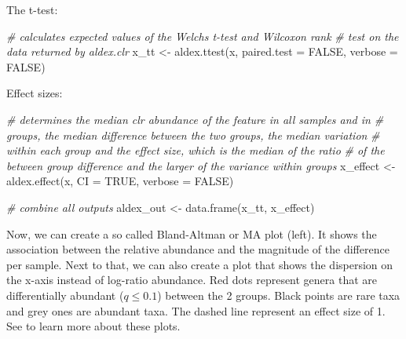 \documentclass[
]{book}
\newenvironment{Shaded}{\begin{snugshade}}{\end{snugshade}}
\newcommand{\AttributeTok}[1]{\textcolor[rgb]{0.77,0.63,0.00}{#1}}
\newcommand{\CommentTok}[1]{\textcolor[rgb]{0.56,0.35,0.01}{\textit{#1}}}
\newcommand{\ConstantTok}[1]{\textcolor[rgb]{0.00,0.00,0.00}{#1}}
\newcommand{\DecValTok}[1]{\textcolor[rgb]{0.00,0.00,0.81}{#1}}
\newcommand{\FunctionTok}[1]{\textcolor[rgb]{0.00,0.00,0.00}{#1}}
\newcommand{\NormalTok}[1]{#1}
\newcommand{\OtherTok}[1]{\textcolor[rgb]{0.56,0.35,0.01}{#1}}
\newcommand{\SpecialCharTok}[1]{\textcolor[rgb]{0.00,0.00,0.00}{#1}}
\begin{document}
\begin{Shaded}
\end{Shaded}

The t-test:

\begin{Shaded}
\begin{Highlighting}[]
\CommentTok{\# calculates expected values of the Welch\textquotesingle{}s t{-}test and Wilcoxon rank}
\CommentTok{\# test on the data returned by aldex.clr}
\NormalTok{x\_tt }\OtherTok{\textless{}{-}} \FunctionTok{aldex.ttest}\NormalTok{(x, }\AttributeTok{paired.test =} \ConstantTok{FALSE}\NormalTok{, }\AttributeTok{verbose =} \ConstantTok{FALSE}\NormalTok{)}
\end{Highlighting}
\end{Shaded}

Effect sizes:

\begin{Shaded}
\begin{Highlighting}[]
\CommentTok{\# determines the median clr abundance of the feature in all samples and in}
\CommentTok{\# groups, the median difference between the two groups, the median variation}
\CommentTok{\# within each group and the effect size, which is the median of the ratio}
\CommentTok{\# of the between group difference and the larger of the variance within groups}
\NormalTok{x\_effect }\OtherTok{\textless{}{-}} \FunctionTok{aldex.effect}\NormalTok{(x, }\AttributeTok{CI =} \ConstantTok{TRUE}\NormalTok{, }\AttributeTok{verbose =} \ConstantTok{FALSE}\NormalTok{)}

\CommentTok{\# combine all outputs }
\NormalTok{aldex\_out }\OtherTok{\textless{}{-}} \FunctionTok{data.frame}\NormalTok{(x\_tt, x\_effect)}
\end{Highlighting}
\end{Shaded}

Now, we can create a so called Bland-Altman or MA plot (left). It shows the
association between the relative abundance and the magnitude of the difference
per sample. Next to that, we can also create a plot that shows the dispersion
on the x-axis instead of log-ratio abundance. Red dots represent genera that are
differentially abundant (\(q \leq 0.1\)) between the 2 groups. Black points are
rare taxa and grey ones are abundant taxa. The dashed line represent an effect
size of 1. See \citet{Gloor2016} to learn more about these plots.
\end{document}
